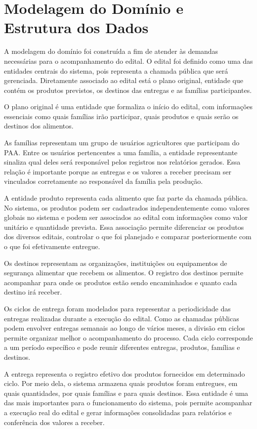 \section{Modelagem do Domínio e Estrutura dos Dados}

A modelagem do domínio foi construída a fim de atender às demandas necessárias para o acompanhamento do edital. O edital foi definido como uma das entidades centrais do sistema, pois representa a chamada pública que será gerenciada. Diretamente associado ao edital está o plano original, entidade que contém os produtos previstos, os destinos das entregas e as famílias participantes.

O plano original é uma entidade que formaliza o início do edital, com informações essenciais como quais famílias irão participar, quais produtos e quais serão os destinos dos alimentos.

As famílias representam um grupo de usuários agricultores que participam do PAA. Entre os usuários pertencentes a uma família, a entidade representante sinaliza qual deles será responsável pelos registros nos relatórios gerados. Essa relação é importante porque as entregas e os valores a receber precisam ser vinculados corretamente ao responsável da família pela produção.

A entidade produto representa cada alimento que faz parte da chamada pública. No sistema, os produtos podem ser cadastrados independentemente como valores globais no sistema e podem ser associados ao edital com informações como valor unitário e quantidade prevista. Essa associação permite diferenciar os produtos dos diversos editais, controlar o que foi planejado e comparar posteriormente com o que foi efetivamente entregue.

Os destinos representam as organizações, instituições ou equipamentos de segurança alimentar que recebem os alimentos. O registro dos destinos permite acompanhar para onde os produtos estão sendo encaminhados e quanto cada destino irá receber.

Os ciclos de entrega foram modelados para representar a periodicidade das entregas realizadas durante a execução do edital. Como as chamadas públicas podem envolver entregas semanais ao longo de vários meses, a divisão em ciclos permite organizar melhor o acompanhamento do processo. Cada ciclo corresponde a um período específico e pode reunir diferentes entregas, produtos, famílias e destinos.

A entrega representa o registro efetivo dos produtos fornecidos em determinado ciclo. Por meio dela, o sistema armazena quais produtos foram entregues, em quais quantidades, por quais famílias e para quais destinos. Essa entidade é uma das mais importantes para o funcionamento do sistema, pois permite acompanhar a execução real do edital e gerar informações consolidadas para relatórios e conferência dos valores a receber.

